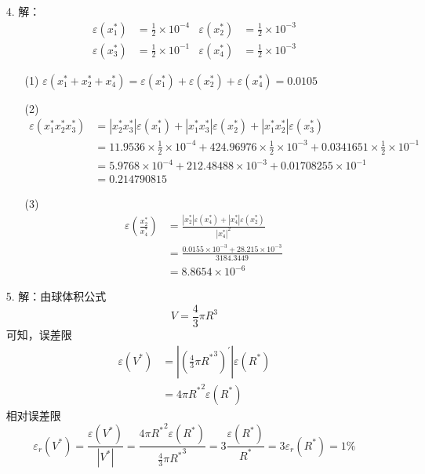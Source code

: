 \documentclass{sjtuarticle}
\begin{document}
\begin{itemize}
    \item[4.] 解：
        \begin{align*}
            \varepsilon(x_1^*)&=\frac{1}{2}\times 10^{-4} & \varepsilon(x_2^*)&=\frac{1}{2}\times 10^{-3} \\
            \varepsilon(x_3^*)&=\frac{1}{2}\times 10^{-1} & \varepsilon(x_4^*)&=\frac{1}{2}\times 10^{-3}
        \end{align*}
        \begin{itemize}
            \item[(1)] $\varepsilon(x_1^*+x_2^*+x_4^*)=\varepsilon(x_1^*)+\varepsilon(x_2^*)+\varepsilon(x_4^*)=0.0105$
            \item[(2)] \begin{align*}
                \varepsilon(x_1^*x_2^*x_3^*)&=\left|x_2^*x_3^*\right|\varepsilon(x_1^*)+\left|x_1^*x_3^*\right|\varepsilon(x_2^*)+\left|x_1^*x_2^*\right|\varepsilon(x_3^*)\\
                &=11.9536\times\frac{1}{2}\times 10^{-4}+424.96976\times\frac{1}{2}\times 10^{-3}+0.0341651\times\frac{1}{2}\times 10^{-1}\\
                &=5.9768\times 10^{-4}+212.48488\times 10^{-3}+0.01708255\times 10^{-1}\\
                &=0.214790815
            \end{align*}
            \item[(3)] \begin{align*}
                \varepsilon\left(\frac{x_2^*}{x_4^*}\right)&=\frac{|x_2^*|\varepsilon(x_4^*)+|x_4^*|\varepsilon(x_2^*)}{|x_4^*|^2}\\
                &=\frac{0.0155\times 10^{-3}+28.215\times 10^{-3}}{3184.3449}\\
                &=8.8654\times 10^{-6}
            \end{align*}
        \end{itemize}
    \item[5.] 解：由球体积公式
    \begin{equation*}
        V=\frac{4}{3}\pi R^3
    \end{equation*}
    可知，误差限
    \begin{align*}
        \varepsilon(V^*)&=\left|\left(\frac{4}{3}\pi {R^*}^3\right)^\prime\right|\varepsilon(R^*)\\
        &=4\pi {R^*}^2\varepsilon(R^*)
    \end{align*}
    相对误差限
    \begin{equation*}
        \varepsilon_r(V^*)=\frac{\varepsilon(V^*)}{|V^*|}=\frac{4\pi {R^*}^2\varepsilon(R^*)}{\frac{4}{3}\pi {R^*}^3}=3\frac{\varepsilon(R^*)}{R^*}=3\varepsilon_r(R^*)= 1\%

\end{equation*}
\end{itemize}
\end{document}
